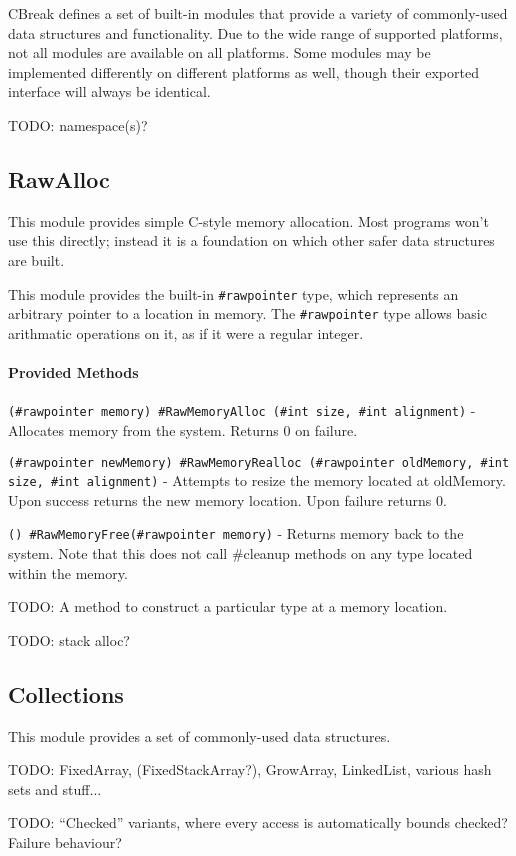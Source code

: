 \documentclass{article}
\newcommand{\code}[1]{\colorbox{light-gray}{\texttt{#1}}}
\newcommand{\breakingparagraph}[1]{\paragraph{#1}\mbox{}\medbreak}
\begin{document}
CBreak defines a set of built-in modules that provide a variety of commonly-used data structures and functionality.  Due to the wide range of supported platforms, not all modules are available on all platforms.  Some modules may be implemented differently on different platforms as well, though their exported interface will always be identical.

TODO: namespace(s)?

\subsection{RawAlloc}

This module provides simple C-style memory allocation.  Most programs won't use this directly; instead it is a foundation on which other safer data structures are built.

This module provides the built-in \code{\#rawpointer} type, which represents an arbitrary pointer to a location in memory.  The \code{\#rawpointer} type allows basic arithmatic operations on it, as if it were a regular integer.

\breakingparagraph{Provided Methods}

\code{(\#rawpointer memory) \#RawMemoryAlloc (\#int size, \#int alignment)} - Allocates memory from the system.  Returns 0 on failure.

\code{(\#rawpointer newMemory) \#RawMemoryRealloc (\#rawpointer oldMemory, \#int size, \#int alignment)} - Attempts to resize the memory located at oldMemory.  Upon success returns the new memory location.  Upon failure returns 0.

\code{() \#RawMemoryFree(\#rawpointer memory)} - Returns memory back to the system.  Note that this does not call \#cleanup methods on any type located within the memory.

TODO: A method to construct a particular type at a memory location.

TODO: stack alloc?

\subsection{Collections}

This module provides a set of commonly-used data structures.

TODO: FixedArray, (FixedStackArray?), GrowArray, LinkedList, various hash sets and stuff...

TODO: ``Checked'' variants, where every access is automatically bounds checked?  Failure behaviour?
\end{document}
